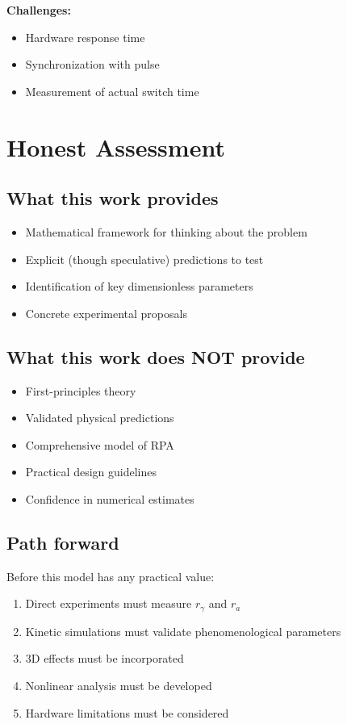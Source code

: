 \documentclass[aps,pre,twocolumn,showpacs,superscriptaddress]{revtex4-2}
\theoremstyle{definition}
\begin{document}
\textbf{Challenges:}
\begin{itemize}
\item Hardware response time
\item Synchronization with pulse
\item Measurement of actual switch time
\end{itemize}

\section{Honest Assessment}\label{sec:assessment}

\subsection{What this work provides}
\begin{itemize}
\item Mathematical framework for thinking about the problem
\item Explicit (though speculative) predictions to test
\item Identification of key dimensionless parameters
\item Concrete experimental proposals
\end{itemize}

\subsection{What this work does NOT provide}
\begin{itemize}
\item First-principles theory
\item Validated physical predictions
\item Comprehensive model of RPA
\item Practical design guidelines
\item Confidence in numerical estimates
\end{itemize}

\subsection{Path forward}

Before this model has any practical value:
\begin{enumerate}
\item Direct experiments must measure $r_\gamma$ and $r_a$
\item Kinetic simulations must validate phenomenological parameters
\item 3D effects must be incorporated
\item Nonlinear analysis must be developed
\item Hardware limitations must be considered
\end{enumerate}
\end{document}
